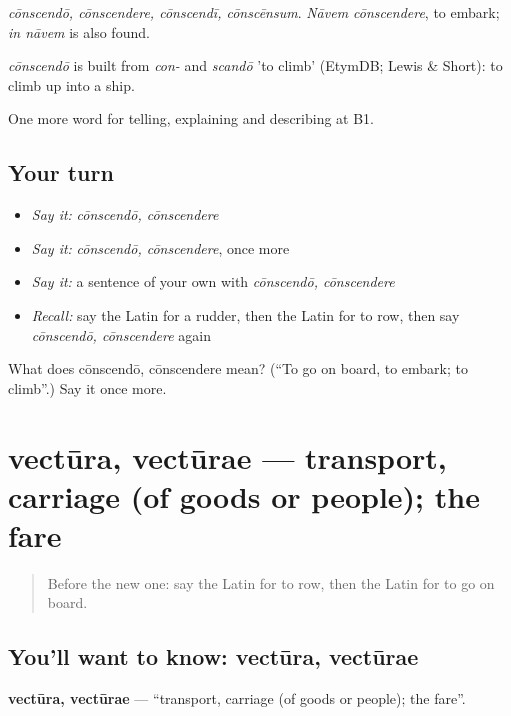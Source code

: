 \emph{cōnscendō, cōnscendere, cōnscendī, cōnscēnsum}. \emph{Nāvem cōnscendere}, to embark; \emph{in nāvem} is also found.

\begin{cousinweb}
\emph{cōnscendō} is built from \emph{con-} and \emph{scandō} 'to climb' (EtymDB; Lewis \& Short): to climb up into a ship.
\end{cousinweb}

\begin{grammarlens}[title={What you've built}]
One more word for telling, explaining and describing at B1.
\end{grammarlens}

\subsection*{Your turn}
\begin{itemize}
\raggedright
  \item \emph{Say it:} \emph{cōnscendō, cōnscendere}
  \item \emph{Say it:} \emph{cōnscendō, cōnscendere}, once more
  \item \emph{Say it:} a sentence of your own with \emph{cōnscendō, cōnscendere}
  \item \emph{Recall:} say the Latin for a rudder, then the Latin for to row, then say \emph{cōnscendō, cōnscendere} again
\end{itemize}

\begin{tcolorbox}[breakable,colback=teal!4,colframe=teal!35!black,title={Before you move on}]
What does cōnscendō, cōnscendere mean? (\textquotedblleft{}To go on board, to embark; to climb\textquotedblright{}.) Say it once more.
\end{tcolorbox}
\section[vectūra, vectūrae]{vectūra, vectūrae — transport, carriage (of goods or people); the fare}

\label{lesson:LA-C438-vectura}



\begin{quote}
Before the new one: say the Latin for to row, then the Latin for to go on board.
\end{quote}

\subsection*{You'll want to know: vectūra, vectūrae}
\textbf{vectūra, vectūrae} — \textquotedblleft{}transport, carriage (of goods or people); the fare\textquotedblright{}.

